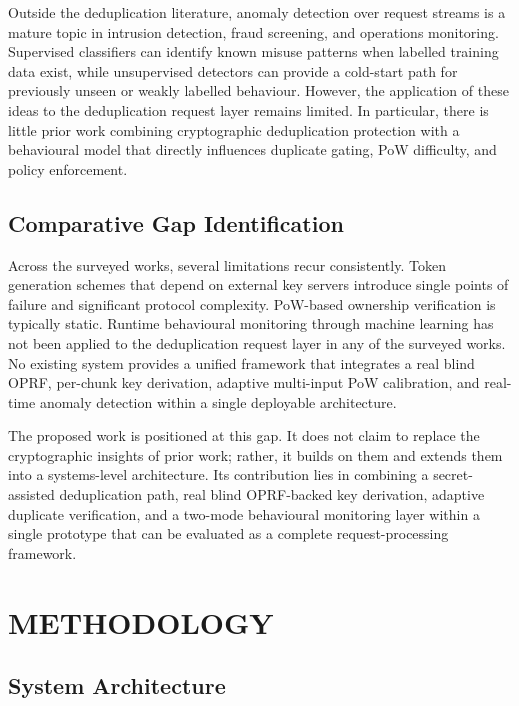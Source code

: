 \documentclass[12pt,a4paper,oneside]{report}
\begin{document}
Outside the deduplication literature, anomaly detection over request streams is a mature topic in intrusion detection, fraud screening, and operations monitoring.
Supervised classifiers can identify known misuse patterns when labelled training data exist, while unsupervised detectors can provide a cold-start path for previously unseen or weakly labelled behaviour.
However, the application of these ideas to the deduplication request layer remains limited.
In particular, there is little prior work combining cryptographic deduplication protection with a behavioural model that directly influences duplicate gating, PoW difficulty, and policy enforcement.

\section{Comparative Gap Identification}

Across the surveyed works, several limitations recur consistently.
Token generation schemes that depend on external key servers introduce single points of failure and significant protocol complexity.
PoW-based ownership verification is typically static.
Runtime behavioural monitoring through machine learning has not been applied to the deduplication request layer in any of the surveyed works.
No existing system provides a unified framework that integrates a real blind OPRF, per-chunk key derivation, adaptive multi-input PoW calibration, and real-time anomaly detection within a single deployable architecture.

The proposed work is positioned at this gap.
It does not claim to replace the cryptographic insights of prior work; rather, it builds on them and extends them into a systems-level architecture.
Its contribution lies in combining a secret-assisted deduplication path, real blind OPRF-backed key derivation, adaptive duplicate verification, and a two-mode behavioural monitoring layer within a single prototype that can be evaluated as a complete request-processing framework.

\chapter{METHODOLOGY}

\section{System Architecture}
\end{document}
